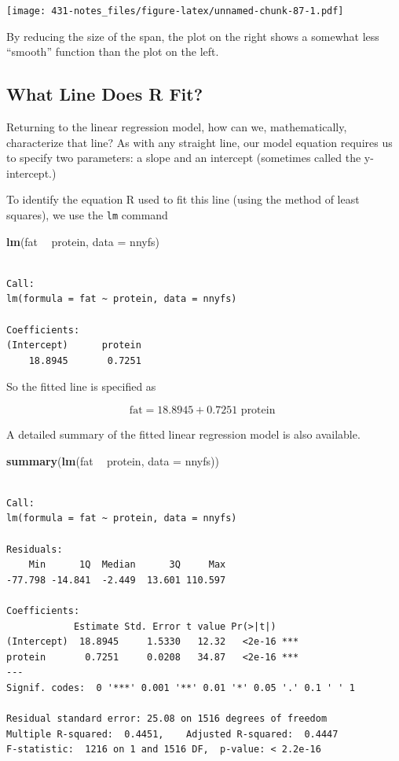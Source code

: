 \documentclass[
]{book}
\newenvironment{Shaded}{\begin{snugshade}}{\end{snugshade}}
\newcommand{\DataTypeTok}[1]{\textcolor[rgb]{0.13,0.29,0.53}{#1}}
\newcommand{\KeywordTok}[1]{\textcolor[rgb]{0.13,0.29,0.53}{\textbf{#1}}}
\newcommand{\NormalTok}[1]{#1}
\newcommand{\OperatorTok}[1]{\textcolor[rgb]{0.81,0.36,0.00}{\textbf{#1}}}
\newcommand{\StringTok}[1]{\textcolor[rgb]{0.31,0.60,0.02}{#1}}
\begin{document}
\texttt{[image: 431-notes\_files/figure-latex/unnamed-chunk-87-1.pdf]}

By reducing the size of the span, the plot on the right shows a somewhat less ``smooth'' function than the plot on the left.

\hypertarget{what-line-does-r-fit}{%
\subsection{What Line Does R Fit?}\label{what-line-does-r-fit}}

Returning to the linear regression model, how can we, mathematically, characterize that line? As with any straight line, our model equation requires us to specify two parameters: a slope and an intercept (sometimes called the y-intercept.)

To identify the equation R used to fit this line (using the method of least squares), we use the \texttt{lm} command

\begin{Shaded}
\begin{Highlighting}[]
\KeywordTok{lm}\NormalTok{(fat }\OperatorTok{~}\StringTok{ }\NormalTok{protein, }\DataTypeTok{data =}\NormalTok{ nnyfs)}
\end{Highlighting}
\end{Shaded}

\begin{verbatim}

Call:
lm(formula = fat ~ protein, data = nnyfs)

Coefficients:
(Intercept)      protein  
    18.8945       0.7251  
\end{verbatim}

So the fitted line is specified as

\[
\mbox{fat} = 18.8945 + 0.7251 \mbox{ protein }
\]

A detailed summary of the fitted linear regression model is also available.

\begin{Shaded}
\begin{Highlighting}[]
\KeywordTok{summary}\NormalTok{(}\KeywordTok{lm}\NormalTok{(fat }\OperatorTok{~}\StringTok{ }\NormalTok{protein, }\DataTypeTok{data =}\NormalTok{ nnyfs))}
\end{Highlighting}
\end{Shaded}

\begin{verbatim}

Call:
lm(formula = fat ~ protein, data = nnyfs)

Residuals:
    Min      1Q  Median      3Q     Max 
-77.798 -14.841  -2.449  13.601 110.597 

Coefficients:
            Estimate Std. Error t value Pr(>|t|)    
(Intercept)  18.8945     1.5330   12.32   <2e-16 ***
protein       0.7251     0.0208   34.87   <2e-16 ***
---
Signif. codes:  0 '***' 0.001 '**' 0.01 '*' 0.05 '.' 0.1 ' ' 1

Residual standard error: 25.08 on 1516 degrees of freedom
Multiple R-squared:  0.4451,	Adjusted R-squared:  0.4447 
F-statistic:  1216 on 1 and 1516 DF,  p-value: < 2.2e-16
\end{verbatim}
\end{document}
